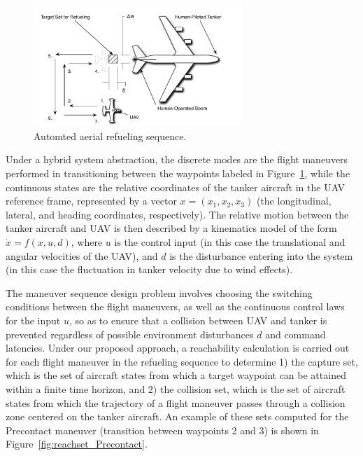                \begin{figure}[thpb]
 	         \centering
	         \includegraphics[width=0.7\textwidth]{img/overhead-crop}
	         \caption{Automted aerial refueling sequence.}
	         \label{fig:AAR_Diagram}
               \end{figure}

               Under a hybrid system abstraction, the discrete modes
               are the flight maneuvers performed in transitioning
               between the waypoints labeled in
               Figure~\ref{fig:AAR_Diagram}, while the continuous
               states are the relative coordinates of the tanker
               aircraft in the UAV reference frame, represented by a
               vector $x = (x_1, x_2, x_3)$ (the longitudinal,
               lateral, and heading coordinates, respectively). The
               relative motion between the tanker aircraft and UAV is
               then described by a kinematics model of the form
               $\dot{x}=f(x,u,d)$, where $u$ is the control input (in
               this case the translational and angular velocities of
               the UAV), and $d$ is the disturbance entering into the
               system (in this case the fluctuation in tanker velocity
               due to wind effects).

               The maneuver sequence design problem involves choosing
               the switching conditions between the flight maneuvers,
               as well as the continuous control laws for the input
               $u$, so as to ensure that a collision between UAV and
               tanker is prevented regardless of possible environment
               disturbances $d$ and command latencies.  Under our
               proposed approach, a reachability calculation is
               carried out for each flight maneuver in the refueling
               sequence to determine 1) the capture set, which is the
               set of aircraft states from which a target waypoint can
               be attained within a finite time horizon, and 2) the
               collision set, which is the set of aircraft states from
               which the trajectory of a flight maneuver passes
               through a collision zone centered on the tanker
               aircraft.  An example of these sets computed for the
               Precontact maneuver (transition between waypoints 2 and
               3) is shown in Figure~\ref{fig:reachset_Precontact}.

